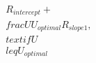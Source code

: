 \documentclass[preview]{standalone}
\begin{document}
\begin{align*}
R_{intercept} + \\frac{U}{U_{optimal}}R_{slope1}, & \\text{if } U \\leq U_{optimal} \\\\
\end{align*}
\end{document}
